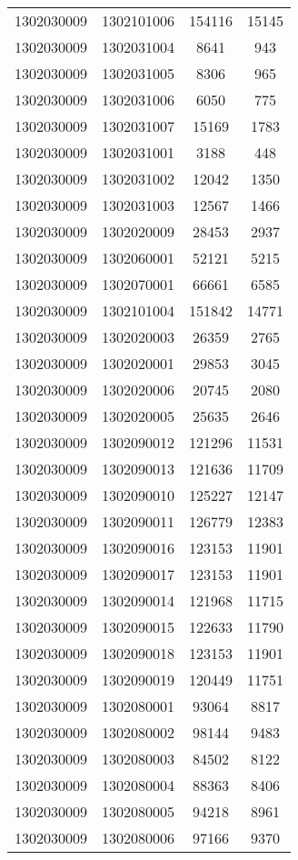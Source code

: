 \begin{longtable}[h]{llcc}
		1302030009 & 1302101006 & 154116 & 15145\\
		1302030009 & 1302031004 & 8641 & 943\\
		1302030009 & 1302031005 & 8306 & 965\\
		1302030009 & 1302031006 & 6050 & 775\\
		1302030009 & 1302031007 & 15169 & 1783\\
		1302030009 & 1302031001 & 3188 & 448\\
		1302030009 & 1302031002 & 12042 & 1350\\
		1302030009 & 1302031003 & 12567 & 1466\\
		1302030009 & 1302020009 & 28453 & 2937\\
		1302030009 & 1302060001 & 52121 & 5215\\
		1302030009 & 1302070001 & 66661 & 6585\\
		1302030009 & 1302101004 & 151842 & 14771\\
		1302030009 & 1302020003 & 26359 & 2765\\
		1302030009 & 1302020001 & 29853 & 3045\\
		1302030009 & 1302020006 & 20745 & 2080\\
		1302030009 & 1302020005 & 25635 & 2646\\
		1302030009 & 1302090012 & 121296 & 11531\\
		1302030009 & 1302090013 & 121636 & 11709\\
		1302030009 & 1302090010 & 125227 & 12147\\
		1302030009 & 1302090011 & 126779 & 12383\\
		1302030009 & 1302090016 & 123153 & 11901\\
		1302030009 & 1302090017 & 123153 & 11901\\
		1302030009 & 1302090014 & 121968 & 11715\\
		1302030009 & 1302090015 & 122633 & 11790\\
		1302030009 & 1302090018 & 123153 & 11901\\
		1302030009 & 1302090019 & 120449 & 11751\\
		1302030009 & 1302080001 & 93064 & 8817\\
		1302030009 & 1302080002 & 98144 & 9483\\
		1302030009 & 1302080003 & 84502 & 8122\\
		1302030009 & 1302080004 & 88363 & 8406\\
		1302030009 & 1302080005 & 94218 & 8961\\
		1302030009 & 1302080006 & 97166 & 9370\\

\end{longtable}
